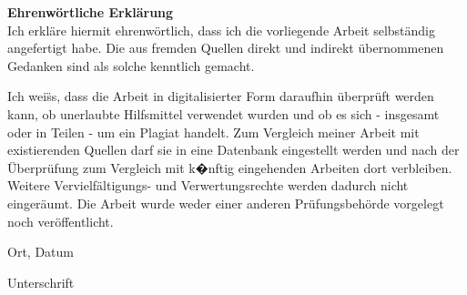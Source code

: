 \cleardoublepage
{}
\thispagestyle{empty}
\textbf{Ehrenw{\"o}rtliche Erkl{\"a}rung}\\

Ich erkl{\"a}re hiermit ehrenw{\"o}rtlich, dass ich die vorliegende Arbeit selbst{\"a}ndig angefertigt habe. Die aus fremden Quellen direkt und indirekt {\"u}bernommenen Gedanken sind als solche kenntlich gemacht.

Ich wei{\"ss}, dass die Arbeit in digitalisierter Form daraufhin {\"u}berpr{\"u}ft werden kann, ob unerlaubte Hilfsmittel verwendet wurden und ob es sich - insgesamt oder in Teilen - um ein Plagiat handelt. Zum Vergleich meiner Arbeit mit existierenden Quellen darf sie in eine Datenbank eingestellt werden und nach der {\"U}berpr{\"u}fung zum Vergleich mit k�nftig eingehenden Arbeiten dort verbleiben. Weitere Verviel\-f{\"a}ltigungs- und Verwertungsrechte werden dadurch nicht einger{\"a}umt. Die Arbeit wurde weder einer anderen Pr{\"u}fungsbeh{\"o}rde vorgelegt noch ver{\"o}ffentlicht.


\vspace{2cm}
Ort, Datum
\vspace{2cm}

Unterschrift

